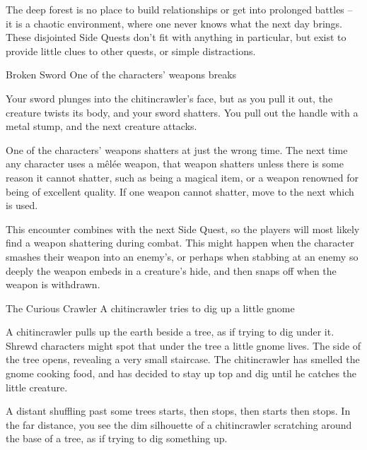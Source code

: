 \label{interruptions}

\noindent
The deep forest is no place to build relationships or get into prolonged battles -- it is a chaotic environment, where one never knows what the next day brings.
These disjointed Side Quests don't fit with anything in particular, but exist to provide little clues to other quests, or simple distractions.

{\squash Broken Sword}%
{One of the characters' weapons breaks}%

\begin{boxtext}

  Your sword plunges into the chitincrawler's face, but as you pull it out, the creature twists its body, and your sword shatters.
  You pull out the handle with a metal stump, and the next creature attacks.

\end{boxtext}

One of the characters' weapons shatters at just the wrong time.
The next time any character uses a m\^el\'ee weapon, that weapon shatters unless there is some reason it cannot shatter, such as being a magical item, or a weapon renowned for being of excellent quality.
If one weapon cannot shatter, move to the next which is used.

This encounter combines with the next Side Quest, so the players will most likely find a weapon shattering during combat.
This might happen when the character smashes their weapon into an enemy's, or perhaps when stabbing at an enemy so deeply the weapon embeds in a creature's hide, and then snaps off when the weapon is withdrawn.


{The Curious Crawler}%
{A chitincrawler tries to dig up a little gnome}%

A chitincrawler pulls up the earth beside a tree, as if trying to dig under it.
Shrewd characters might spot that under the tree a little gnome lives.
The side of the tree opens, revealing a very small staircase.
The chitincrawler has smelled the gnome cooking food, and has decided to stay up top and dig until he catches the little creature.

\begin{boxtext}

  A distant shuffling past some trees starts, then stops, then starts then stops.
  In the far distance, you see the dim silhouette of a chitincrawler scratching around the base of a tree, as if trying to dig something up.

\end{boxtext}


